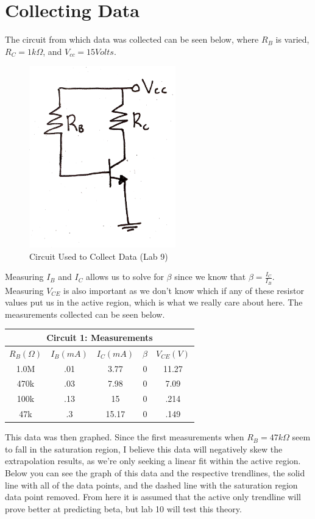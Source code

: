 \documentclass[prb,preprint]{revtex4-1}
\begin{document}
\section{Collecting Data}
The circuit from which data was collected can be seen below, where $R_{B}$ is varied, $R_{C}=1k\Omega$, and $V_{cc}=15 Volts$. 

\begin{figure}[ht]
	\centering
	\includegraphics[width=2.5in]{c9.png}
	\caption{Circuit Used to Collect Data (Lab 9)}
	\label{fig1}
\end{figure}

Measuring $I_{B}$ and $I_{C}$ allows us to solve for $\beta$ since we know that $\beta=\frac{I_{C}}{I_{B}}$. Measuring $V_{CE}$ is also important as we don't know which if any of these resistor values put us in the active region, which is what we really care about here. The measurements collected can be seen below.

\begin{center}
\begin{tabular}{|c|c|c|c|c|}
	\hline
	\multicolumn{5}{|c|}{Circuit 1: Measurements}\\
	\hline
	$R_{B}(\Omega)$ & $I_{B}(mA)$ & $I_{C}(mA)$ & $\beta$ & $V_{CE}(V)$ \\
	\hline
	1.0M & .01 & 3.77 & 0 & 11.27 \\
	470k & .03 & 7.98 & 0 & 7.09 \\
	100k & .13 & 15 & 0 & .214 \\
	47k & .3 & 15.17 & 0 & .149 \\
	\hline
\end{tabular}
\end{center}

This data was then graphed. Since the first measurements when $R_{B}=47k\Omega$ seem to fall in the saturation region, I believe this data will negatively skew the extrapolation results, as we're only seeking a linear fit within the active region. Below you can see the graph of this data and the respective trendlines, the solid line with all of the data points, and the dashed line with the saturation region data point removed. From here it is assumed that the active only trendline will prove better at predicting beta, but lab 10 will test this theory.
\end{document}
